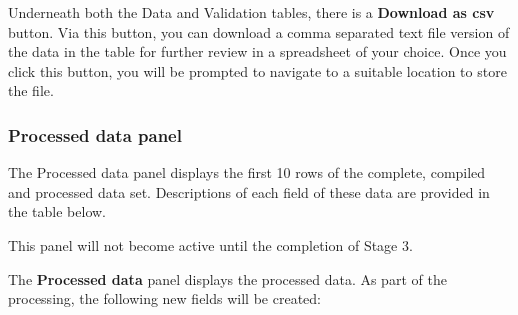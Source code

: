 \documentclass[
  8pt,
  a4paper]{article}
\begin{document}
Underneath both the Data and Validation tables, there is a
\textbf{Download as csv} button. Via this button, you can download a
comma separated text file version of the data in the table for further
review in a spreadsheet of your choice. Once you click this button, you
will be prompted to navigate to a suitable location to store the file.

\subsubsection{Processed data panel}\label{processed-data-panel}

The Processed data panel displays the first 10 rows of the complete,
compiled and processed data set. Descriptions of each field of these
data are provided in the table below.

\begin{tcolorbox}[enhanced jigsaw, coltitle=black, rightrule=.15mm, left=2mm, leftrule=.75mm, colframe=quarto-callout-note-color-frame, colback=white, bottomrule=.15mm, toprule=.15mm, bottomtitle=1mm, opacityback=0, toptitle=1mm, colbacktitle=quarto-callout-note-color!10!white, titlerule=0mm, arc=.35mm, title=\textcolor{quarto-callout-note-color}{\faInfo}\hspace{0.5em}{Note}, breakable, opacitybacktitle=0.6]

This panel will not become active until the completion of Stage 3.

\end{tcolorbox}

The \textbf{Processed data} panel displays the processed data. As part
of the processing, the following new fields will be created:
\end{document}

